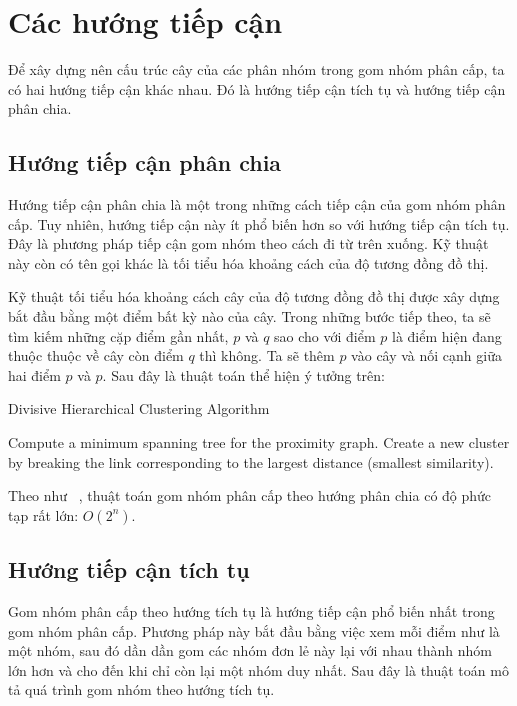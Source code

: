 \section{Các hướng tiếp cận}
Để xây dựng nên cấu trúc cây của các phân nhóm trong gom nhóm phân cấp, ta có hai hướng tiếp cận khác nhau. Đó là hướng tiếp cận tích tụ và hướng tiếp cận phân chia.

\subsection{Hướng tiếp cận phân chia}
Hướng tiếp cận phân chia là một trong những cách tiếp cận của gom nhóm phân cấp.
Tuy nhiên, hướng tiếp cận này ít phổ biến hơn so với hướng tiếp cận tích tụ.
Đây là phương pháp tiếp cận gom nhóm theo cách đi từ trên xuống.
Kỹ thuật này còn có tên gọi khác là tối tiểu hóa khoảng cách của độ tương đồng đồ thị.

Kỹ thuật tối tiểu hóa khoảng cách cây của độ tương đồng đồ thị được xây dựng bắt đầu bằng một điểm bất kỳ nào của cây.
Trong những bước tiếp theo, ta sẽ tìm kiếm những cặp điểm gần nhất, $p$ và $q$ sao cho với điểm $p$ là điểm hiện đang thuộc thuộc về cây còn điểm $q$ thì không.
Ta sẽ thêm $p$ vào cây và nối cạnh giữa hai điểm $p$ và $p$.
Sau đây là thuật toán thể hiện ý tưởng trên:

\begin{algorithm}
\caption{Divisive Hierarchical Clustering Algorithm}
\label{alg:Divisive}
\begin{algorithmic}[1]
\State Compute a minimum spanning tree for the proximity graph.
\Repeat
\State Create a new cluster by breaking the link corresponding to the largest distance (smallest similarity).
\end{algorithmic}
\end{algorithm}

Theo như ~\cite{wiki-HAC}, thuật toán gom nhóm phân cấp theo hướng phân chia có độ phức tạp rất lớn: $O(2^n)$.

		
		
\subsection{Hướng tiếp cận tích tụ}
Gom nhóm phân cấp theo hướng tích tụ là hướng tiếp cận phổ biến nhất trong gom nhóm phân cấp.
Phương pháp này bắt đầu bằng việc xem mỗi điểm như là một nhóm, sau đó dần dần gom các nhóm đơn lẻ này lại với nhau thành nhóm lớn hơn và cho đến khi chỉ còn lại một nhóm duy nhất.
Sau đây là thuật toán mô tả quá trình gom nhóm theo hướng tích tụ.

